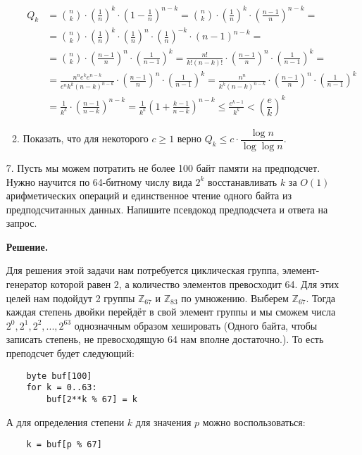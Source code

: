 \begin{enumerate}
\begin{enumerate}
		\begin{align*}
			Q_k &= \binom{n}{k}\cdot \left( \frac{1}{n} \right)^k \cdot \left(1 - \frac{1}{n} \right)^{n-k} =
			\binom{n}{k}\cdot \left( \frac{1}{n} \right)^k \cdot \left(\frac{n-1}{n} \right)^{n-k} = \\
			&=\binom{n}{k} \cdot \left( \frac{1}{n} \right)^k \cdot \left( \frac{1}{n} \right)^n \cdot \left( 
			\frac{1}{n} \right)^{-k} \cdot (n - 1)^{n - k} = \\
			&=\binom{n}{k} \cdot \left( \frac{n - 1}{n} \right)^n \cdot \left(\frac{1}{n - 1} \right)^{k} =
			 \frac{n!}{k!(n-k)!} \cdot \left( \frac{n - 1}{n} \right)^n \cdot \left(\frac{1}{n - 1} \right)^{k} 
			 =\\
			&= \frac{n^n e^k e^{n - k}}{e^n k^k (n-k)^{n-k}}\cdot \left( \frac{n - 1}{n} \right)^n \cdot \left(\frac{1}{n - 1} \right)^{k} = \frac{n^n}{k^k (n-k)^{n-k}}\cdot \left( \frac{n - 1}{n} \right)^n \cdot \left(\frac{1}{n - 1} \right)^{k}\\
			&= \frac{1}{k^k} \cdot \left( \frac{n - 1}{n - k} \right)^{n - k} = \frac{1}{k^k} \left( 1+ \frac{k - 
				1}{n - k} \right)^{n - k} \leqslant \frac{e^{k - 1}}{k^k} < \left(\dfrac{e}{k}\right)^k
		\end{align*}
		
		\item Показать, что для некоторого $c \ge 1$ верно $Q_k \leqslant c \cdot \dfrac{\log n}{\log \log n}$.
	\end{enumerate}
	
	\item[7.] Пусть мы можем потратить не более 100 байт памяти на предподсчет. Нужно научится по 64-битному 
	числу вида $2^k$ восстанавливать $k$ за $O(1)$ арифметических операций и единственное
	чтение одного байта из предподсчитанных данных. Напишите псевдокод предподсчета и ответа на 
	запрос.
	
	\textbf{Решение.}
	
	Для решения этой задачи нам потребуется циклическая группа, элемент-генератор которой равен $2$, а количество 
	элементов превосходит 64. Для этих целей нам подойдут 2 группы $\mathbb{Z}_{67}$ и $\mathbb{Z}_{83}$ по 
	умножению. Выберем $\mathbb{Z}_{67}$. Тогда каждая степень двойки перейдёт в свой элемент группы и мы сможем 
	числа $2^0, 2^1, 2^2, ..., 2^{63}$ однозначным образом хешировать (Одного байта, чтобы записать степень, не превосходящую 64 нам вполне достаточно.). То есть преподсчет будет следующий:
	\begin{lstlisting}
	byte buf[100]
	for k = 0..63:
		buf[2**k % 67] = k
	\end{lstlisting}
	А для определения степени $k$ для значения $p$ можно воспользоваться:
	\begin{lstlisting}
	k = buf[p % 67]
	\end{lstlisting}
	

\end{enumerate}
